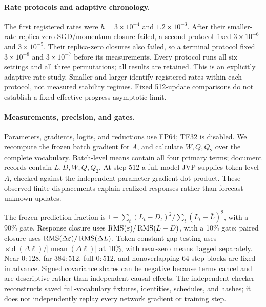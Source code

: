 \paragraph{Rate protocols and adaptive chronology.}
The first registered rates were \(h=3\times10^{-4}\) and \(1.2\times10^{-3}\).  After their smaller-rate replica-zero SGD/momentum closure failed, a second protocol fixed \(3\times10^{-6}\) and \(3\times10^{-5}\).  Their replica-zero closures also failed, so a terminal protocol fixed \(3\times10^{-8}\) and \(3\times10^{-7}\) before its measurements.  Every protocol runs all six settings and all three permutations; all results are retained.  This is an explicitly adaptive rate study.  Smaller and larger identify registered rates within each protocol, not measured stability regimes.  Fixed 512-update comparisons do not establish a fixed-effective-progress asymptotic limit.

\paragraph{Measurements, precision, and gates.}
Parameters, gradients, logits, and reductions use FP64; TF32 is disabled.  We recompute the frozen batch gradient for \(A\), and calculate \(W,Q,Q_2\) over the complete vocabulary.  Batch-level means contain all four primary terms; document records contain \(L,D,W,Q,Q_2\).  At step 512 a full-model JVP supplies token-level \(A\), checked against the independent parameter-gradient dot product.  These observed finite displacements explain realized responses rather than forecast unknown updates.

The frozen prediction fraction is \(1-\sum_t(L_t-D_t)^2/\sum_t(L_t-\bar L)^2\), with a 90\% gate.  Response closure uses \(\operatorname{RMS}(\varepsilon)/\operatorname{RMS}(L-D)\), with a 10\% gate; paired closure uses \(\operatorname{RMS}(\Delta\varepsilon)/\operatorname{RMS}(\Delta L)\).  Token constant-gap testing uses \(\operatorname{std}(\Delta\ell)/|\operatorname{mean}(\Delta\ell)|\) at 10\%, with near-zero means flagged separately.  Near \(0{:}128\), far \(384{:}512\), full \(0{:}512\), and nonoverlapping 64-step blocks are fixed in advance.  Signed covariance shares can be negative because terms cancel and are descriptive rather than independent causal effects.  The independent checker reconstructs saved full-vocabulary fixtures, identities, schedules, and hashes; it does not independently replay every network gradient or training step.
